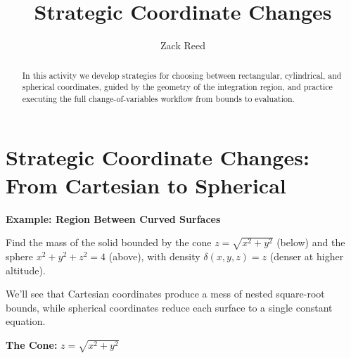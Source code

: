 \documentclass{ximera}
\title{Strategic Coordinate Changes}
\author{Zack Reed}
\begin{document}
\begin{abstract}
In this activity we develop strategies for choosing between rectangular, cylindrical, and spherical coordinates, guided by the geometry of the integration region, and practice executing the full change-of-variables workflow from bounds to evaluation.
\end{abstract}
\maketitle


\section*{Strategic Coordinate Changes: From Cartesian to Spherical}

\begin{problem}
\textbf{Example: Region Between Curved Surfaces}

Find the mass of the solid bounded by the cone $z = \sqrt{x^2 + y^2}$ (below) and the sphere $x^2 + y^2 + z^2 = 4$ (above), with density $\delta(x,y,z) = z$ (denser at higher altitude).

We'll see that Cartesian coordinates produce a mess of nested square-root bounds, while spherical coordinates reduce each surface to a single constant equation.

\textbf{The Cone:} $z = \sqrt{x^2 + y^2}$

\begin{center}
\end{center}
\end{problem}
\end{document}
